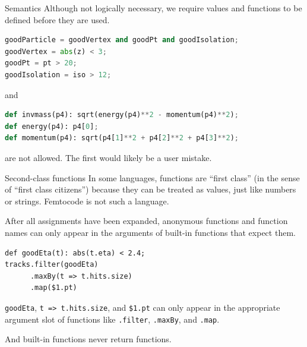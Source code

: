 \documentclass{beamer}
\begin{document}
\begin{frame}[fragile]{Semantics}
\vspace{0.5 cm}
Although not logically necessary, we require values and functions to be defined before they are used.

\begin{center}
\begin{minipage}{0.9\linewidth}
\small
\begin{lstlisting}[language=python]
goodParticle = goodVertex and goodPt and goodIsolation;
goodVertex = abs(z) < 3;
goodPt = pt > 20;
goodIsolation = iso > 12;
\end{lstlisting}
\hspace{-0.6 cm} and
\begin{lstlisting}[language=python]
def invmass(p4): sqrt(energy(p4)**2 - momentum(p4)**2);
def energy(p4): p4[0];
def momentum(p4): sqrt(p4[1]**2 + p4[2]**2 + p4[3]**2);
\end{lstlisting}
\end{minipage}
\end{center}

are not allowed. The first would likely be a user mistake.
\end{frame}

\begin{frame}[fragile]{Second-class functions}
\vspace{0.5 cm}
In some languages, functions are ``first class'' (in the sense of ``first class citizens'') because they can be treated as values, just like numbers or strings. Femtocode is not such a language.

\vspace{0.5 cm}
After all assignments have been expanded, anonymous functions and function names can only appear in the arguments of built-in functions that expect them.

\begin{center}
\begin{minipage}{0.9\linewidth}
\small
\begin{verbatim}
def goodEta(t): abs(t.eta) < 2.4;
tracks.filter(goodEta)
      .maxBy(t => t.hits.size)
      .map($1.pt)
\end{verbatim}
\end{minipage}
\end{center}

{\tt goodEta}, {\tt t => t.hits.size}, and {\tt \$1.pt} can only appear in the appropriate argument slot of functions like {\tt .filter}, {\tt .maxBy}, and {\tt .map}.

\vspace{0.5 cm}
And built-in functions never return functions.
\end{frame}
\end{document}
